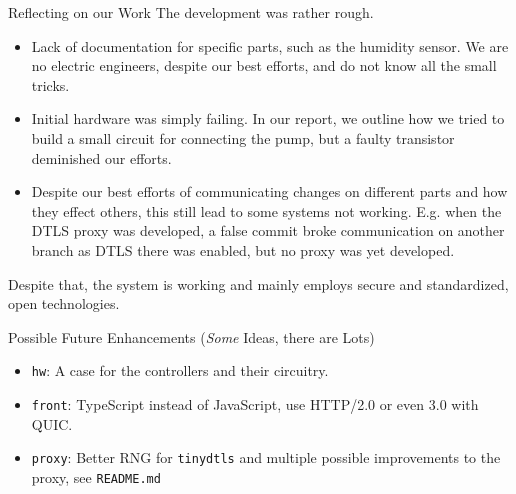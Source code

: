 \documentclass[10pt, xcolor=svgnames]{beamer}
\begin{document}
\begin{frame}{Reflecting on our Work}
    The development was rather rough.
    \begin{itemize}
        \item Lack of documentation for specific parts, such as the humidity sensor. We are no electric engineers, despite our best efforts, and do not know all the small tricks.
        \item Initial hardware was simply failing. In our report, we outline how we tried to build a small circuit for connecting the pump, but a faulty transistor deminished our efforts.
        \item Despite our best efforts of communicating changes on different parts and how they effect others, this still lead to some systems not working. E.g. when the DTLS proxy was developed, a false commit broke communication on another branch as DTLS there was enabled, but no proxy was yet developed.
    \end{itemize}

    Despite that, the system is working and mainly employs secure and standardized, open technologies.
\end{frame}

\begin{frame}{Possible Future Enhancements (\emph{Some} Ideas, there are Lots)}
    \begin{itemize}
        \item \texttt{hw}: A case for the controllers and their circuitry.
        \item \texttt{front}: TypeScript instead of JavaScript, use HTTP/2.0 or even 3.0 with QUIC.
        \item \texttt{proxy}: Better RNG for \texttt{tinydtls} and multiple possible improvements to the proxy, see \texttt{README.md}
    \end{itemize}
\end{frame}
\end{document}

